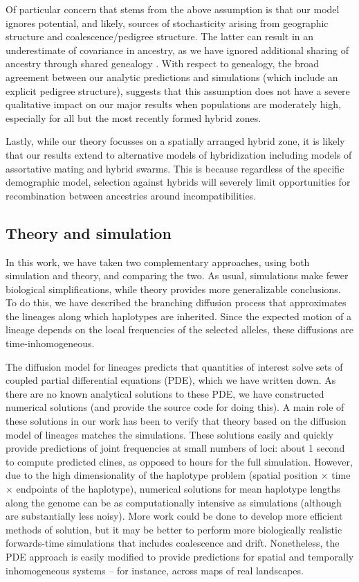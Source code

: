 \documentclass[11pt,letterpaper]{article}
\begin{document}
Of particular concern that stems from the above assumption is that our model ignores potential, and likely, sources of stochasticity arising from geographic structure and coalescence/pedigree structure. The latter can result in an underestimate of covariance in ancestry, as we have ignored additional sharing of ancestry through shared genealogy \cite{Liang2014}. With respect to genealogy, the broad agreement between our analytic predictions and simulations (which include an explicit pedigree structure), suggests that this assumption does not have a severe qualitative impact on our major results when populations are moderately high, especially for all but the most recently formed hybrid zones. 

Lastly, while our theory focusses on a spatially arranged hybrid zone, it is likely that our results extend to alternative models of hybridization including models of assortative mating and hybrid swarms. This is because regardless of the specific demographic model, selection against hybrids will severely limit opportunities for recombination between ancestries around incompatibilities.




\subsection*{Theory and simulation}
In this work, we have taken two complementary approaches,
using both simulation and theory, and comparing the two.
As usual, simulations make fewer biological simplifications,
while theory provides more generalizable conclusions.
To do this, we have described the branching diffusion process that approximates
the lineages along which haplotypes are inherited.
Since the expected motion of a lineage depends on the local frequencies of the selected alleles,
these diffusions are time-inhomogeneous.

The diffusion model for lineages predicts that quantities of interest solve sets of coupled partial differential equations (PDE),
which we have written down.
As there are no known analytical solutions to these PDE,
we have constructed numerical solutions (and provide the source code for doing this).
A main role of these solutions in our work has been to verify that theory based on the diffusion model of lineages
matches the simulations.
These solutions easily and quickly provide predictions of joint frequencies at small numbers of loci:
about 1 second to compute predicted clines, as opposed to hours for the full simulation.
However, due to the high dimensionality of the haplotype problem (spatial position $\times$ time $\times$ endpoints of the haplotype),
numerical solutions for mean haplotype lengths along the genome can be as computationally intensive as simulations
(although are substantially less noisy).
More work could be done to develop more efficient methods of solution,
but it may be better to perform more biologically realistic forwards-time simulations that includes coalescence and drift.
Nonetheless, the PDE approach is easily modified to provide predictions for spatial and temporally inhomogeneous systems --
for instance, across maps of real landscapes.
\end{document}
